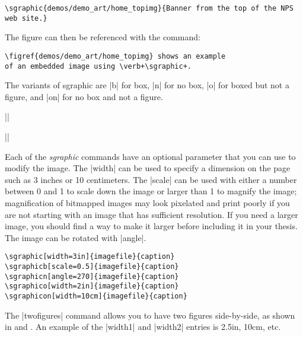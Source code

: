 \begin{Verbatim}[fontsize=\small]
\sgraphic{demos/demo_art/home_topimg}{Banner from the top of the NPS web site.}
\end{Verbatim}

The figure can then be referenced with the command:

\begin{Verbatim}
\figref{demos/demo_art/home_topimg} shows an example 
of an embedded image using \verb+\sgraphic+.
\end{Verbatim}


The variants of sgraphic are |b| for box, |n| for no box, |o| for boxed but not a figure, and |on| for no box and not a figure.

||

||



Each of the \emph{sgraphic} commands have an optional parameter that
you can use to modify the image.  The |width| can be used to specify a
dimension on the page such as 3 inches or 10 centimeters.  The |scale|
can be used with either a number between 0 and 1 to scale down the
image or larger than 1 to magnify the image; magnification of
bitmapped images may look pixelated and print poorly if you are not
starting with an image that has sufficient resolution. If
you need a larger image, you should find a way to make it larger
before including it in your thesis.  The image can be rotated with
|angle|.

\begin{Verbatim}
\sgraphic[width=3in]{imagefile}{caption}
\sgraphicb[scale=0.5]{imagefile}{caption}
\sgraphicn[angle=270]{imagefile}{caption}
\sgraphico[width=2in]{imagefile}{caption}
\sgraphicon[width=10cm]{imagefile}{caption}
\end{Verbatim}

The |twofigures| command allows you to have two figures side-by-side, 
as shown in  and .
An example of the |width1| and |width2| entries is 2.5in, 10cm, etc.

